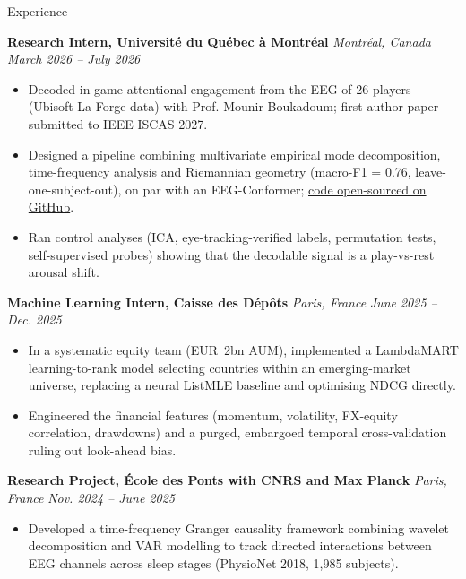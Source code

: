 \documentclass{resume} %
\begin{document}
\begin{rSection}{Experience}
\vspace{0.1cm}

{\bf Research Intern, Université du Québec à Montréal} \raisebox{0.2ex}{\scriptsize \textbullet} {\em  \hspace{1em} Montréal, Canada} \hfill {\em March 2026 -- July 2026} 
\begin{itemize}
    \item Decoded in-game attentional engagement from the EEG of 26 players (Ubisoft La Forge data) with Prof. Mounir Boukadoum; first-author paper submitted to IEEE ISCAS 2027.
    \item Designed a pipeline combining multivariate empirical mode decomposition, time-frequency analysis and Riemannian geometry (macro-F1 = 0.76, leave-one-subject-out), on par with an EEG-Conformer; \href{https://github.com/luchocomputor/flow-state-uqam}{code open-sourced on GitHub}.
    \item Ran control analyses (ICA, eye-tracking-verified labels, permutation tests, self-supervised probes) showing that the decodable signal is a play-vs-rest arousal shift.
\end{itemize}

{\bf Machine Learning Intern, Caisse des Dépôts} \raisebox{0.2ex}{\scriptsize \textbullet} {\em  \hspace{1em} Paris, France} \hfill {\em June 2025 -- Dec. 2025} 
\begin{itemize}
    \item In a systematic equity team (EUR~2bn AUM), implemented a LambdaMART learning-to-rank model selecting countries within an emerging-market universe, replacing a neural ListMLE baseline and optimising NDCG directly.
    \item Engineered the financial features (momentum, volatility, FX-equity correlation, drawdowns) and a purged, embargoed temporal cross-validation ruling out look-ahead bias.
\end{itemize}

{\bf Research Project, École des Ponts with CNRS and Max Planck} \raisebox{0.2ex}{\scriptsize \textbullet} {\em \hspace{1em} Paris, France} \hfill {\em Nov. 2024 -- June 2025}
\begin{itemize}
    \item Developed a time-frequency Granger causality framework combining wavelet decomposition and VAR modelling to track directed interactions between EEG channels across sleep stages (PhysioNet 2018, 1,985 subjects).



\end{itemize}
\end{rSection}
\end{document}
